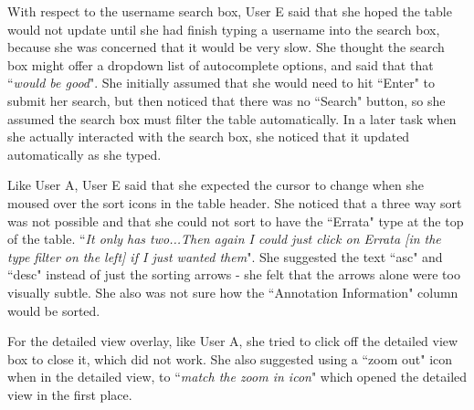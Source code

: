 With respect to the username search box, User E said that she hoped the table would not update until she had finish typing a username into the search box, because she was concerned that it would be very slow. She thought the search box might offer a dropdown list of autocomplete options, and said that that ``\textit{would be good}". She initially assumed that she would need to hit ``Enter" to submit her search, but then noticed that there was no ``Search" button, so she assumed the search box must filter the table automatically. In a later task when she actually interacted with the search box, she noticed that it updated automatically as she typed. 

Like User A, User E said that she expected the cursor to change when she moused over the sort icons in the table header. She noticed that a three way sort was not possible and that she could not sort to have the ``Errata" type at the top of the table. ``\textit{It only has two...Then again I could just click on Errata [in the type filter on the left] if I just wanted them}". She suggested the text ``asc" and ``desc" instead of just the sorting arrows - she felt that the arrows alone were too visually subtle. She also was not sure how the ``Annotation Information" column would be sorted. 

For the detailed view overlay, like User A, she tried to click off the detailed view box to close it, which did not work. She also suggested using a ``zoom out" icon when in the detailed view, to ``\textit{match the zoom in icon}" which opened the detailed view in the first place. 

